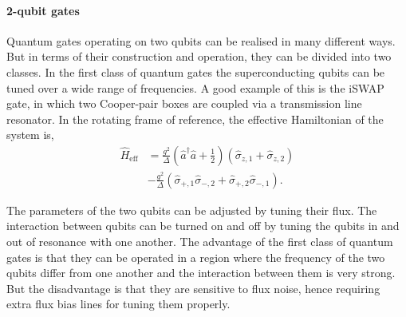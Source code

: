 \paragraph{2-qubit gates}

Quantum gates operating on two qubits can be realised in many different ways. But in terms of their construction and operation, they can be divided into two classes. In the first class of quantum gates the superconducting qubits can be tuned over a wide range of frequencies. A good example of this is the iSWAP gate, in which two Cooper-pair boxes are coupled via a transmission line resonator. In the rotating frame of reference, the effective Hamiltonian of the system is,
\begin{align}
\hat{H}_\mathrm{eff} &= \frac{g^{2}}{\Delta} \left( \hat{a}^{\dag} \hat{a} + \frac{1}{2} \right) (\hat\sigma_{z,1} + \hat\sigma_{z,2}) \nonumber\\
&- \frac{g^{2}}{\Delta} (\hat\sigma_{+,1} \hat\sigma_{-,2} + \hat\sigma_{+,2} \hat\sigma_{-,1}).
\end{align}

The parameters of the two qubits can be adjusted by tuning their flux. The interaction between qubits can be turned on and off by tuning the qubits in and out of resonance with one another. The advantage of the first class of quantum gates is that they can be operated in a region where the frequency of the two qubits differ from one another and the interaction between them is very strong. But the disadvantage is that they are sensitive to flux noise, hence requiring extra flux bias lines for tuning them properly.

